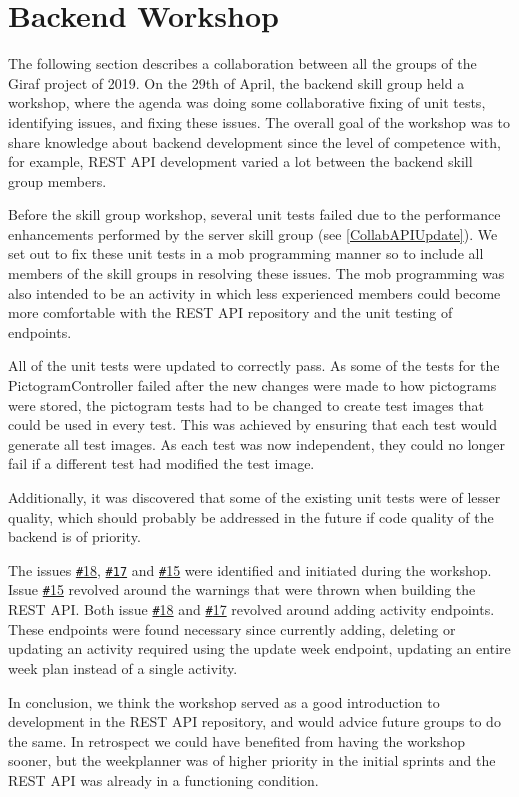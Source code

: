 \section{Backend Workshop} \label{SEC:workshopAPIcollab}
The following section describes a collaboration between all the groups of the Giraf project of 2019. 
On the 29th of April, the backend skill group held a workshop, where the agenda was doing some collaborative fixing of unit tests, identifying issues, and fixing these issues. 
The overall goal of the workshop was to share knowledge about backend development since the level of competence with, for example, REST API development varied a lot between the backend skill group members.

Before the skill group workshop, several unit tests failed due to the performance enhancements performed by the server skill group (see \autoref{CollabAPIUpdate}). 
We set out to fix these unit tests in a mob programming manner so to include all members of the skill groups in resolving these issues.
The mob programming was also intended to be an activity in which less experienced members could become more comfortable with the REST API repository and the unit testing of endpoints.

All of the unit tests were updated to correctly pass.
As some of the tests for the PictogramController failed after the new changes were made to how pictograms were stored, the pictogram tests had to be changed to create test images that could be used in every test.
This was achieved by ensuring that each test would generate all test images.
As each test was now independent, they could no longer fail if a different test had modified the test image.

Additionally, it was discovered that some of the existing unit tests were of lesser quality, which should probably be addressed in the future if code quality of the backend is of priority.

The issues \href{https://github.com/aau-giraf/web-api/issues/18}{\texttt{\#}18}, \href{https://github.com/aau-giraf/web-api/issues/17}{\texttt{\#17}} and \href{https://github.com/aau-giraf/web-api/issues/15}{\texttt{\#}15} were identified and initiated during the workshop.
Issue \href{https://github.com/aau-giraf/web-api/issues/15}{\texttt{\#}15} revolved around the warnings that were thrown when building the REST API.
Both issue \href{https://github.com/aau-giraf/web-api/issues/18}{\texttt{\#}18} and \href{https://github.com/aau-giraf/web-api/issues/17}{\texttt{\#}17} revolved around adding activity endpoints.
These endpoints were found necessary since currently adding, deleting or updating an activity required using the update week endpoint, updating an entire week plan instead of a single activity. 
 
In conclusion, we think the workshop served as a good introduction to development in the REST API repository, and would advice future groups to do the same.
In retrospect we could have benefited from having the workshop sooner, but the weekplanner was of higher priority in the initial sprints and the REST API was already in a functioning condition.

